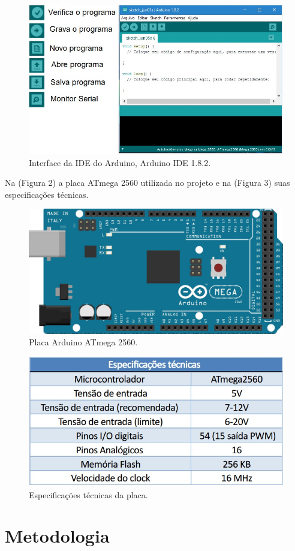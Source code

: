 \documentclass[12pt]{article}
\begin{document}
\begin{figure}[ht]
\centering
\includegraphics[width=.9\textwidth]{ide.jpg}
\caption{Interface da IDE do Arduino, Arduino IDE 1.8.2.}
\label{fig:exampleFig1}
\end{figure}
 Na (Figura 2) a placa ATmega 2560 utilizada no projeto e na (Figura 3) suas especificações técnicas.
\begin{figure}[ht]
\centering
\includegraphics[width=.6\textwidth]{placa.jpg}
\caption{Placa Arduino ATmega 2560.}
\label{fig:exampleFig1}
\end{figure}

\begin{figure}[ht]
\centering
\includegraphics[width=.6\textwidth]{espplaca.jpg}
\caption{Especificações técnicas da placa.}
\label{fig:exampleFig1}
\end{figure}



\section{Metodologia}
\end{document}
